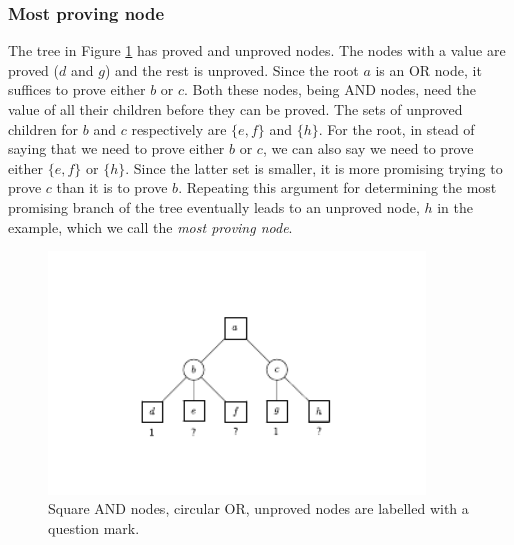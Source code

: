 \documentclass{article}
\begin{document}
\subsubsection*{Most proving node}
The tree in Figure \ref{tree:pnex} has proved and unproved nodes. The nodes with a value are proved ($d$ and $g$) and the rest is unproved.
Since the root $a$ is an OR node, it suffices
to prove either $b$ or $c$. Both these nodes, being AND nodes, need the value of all their children before they can be proved. The sets of
unproved children for $b$ and $c$ respectively are $\{e, f\}$ and $\{h\}$. For the root, in stead of saying that we need to prove
either $b$ or $c$, we can also say we need to prove either $\{e, f\}$ or $\{h\}$. Since the latter set is smaller, it is more
promising trying to prove $c$ than it is to prove $b$. Repeating this argument for determining the most promising branch of the tree
eventually leads to an unproved node, $h$ in the example, which we call the \textit{most proving node}.

\begin{figure}[h]
\center
\includegraphics[width=10cm]{proofset.pdf}
\caption{Square AND nodes, circular OR, unproved nodes are labelled with a question mark.}
\label{tree:pnex}
\end{figure}
\end{document}
